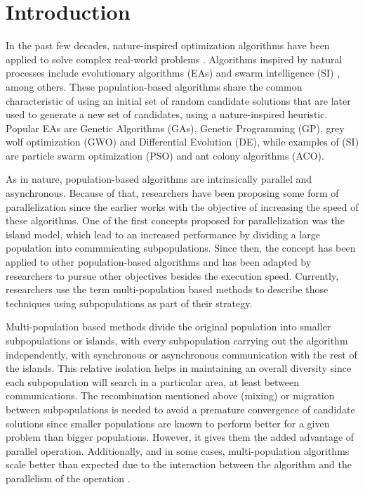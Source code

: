 \documentclass[runningheads]{llncs}
\begin{document}
\section{Introduction}

In the past few decades, nature-inspired optimization algorithms have been
applied to solve complex real-world problems \cite{yang2014nature}. Algorithms
inspired by natural processes include evolutionary algorithms (EAs)
\cite{back1996evolutionary} and swarm intelligence (SI) \cite{kennedy2006swarm},
among others. These population-based algorithms share the common characteristic
of using an initial set of random candidate solutions that are later used to
generate a new set of candidates, using a nature-inspired heuristic. Popular EAs
are Genetic Algorithms (GAs), Genetic Programming (GP), grey wolf optimization
(GWO) and Differential Evolution (DE), while examples of (SI) are particle swarm
optimization (PSO) and ant colony algorithms (ACO).


As in nature, population-based algorithms
are intrinsically parallel and asynchronous. Because of that, researchers have
been proposing some form of parallelization since the earlier works
\cite{muhlenbein1988evolution} with the objective of increasing the speed of
these algorithms. 
One of the first concepts proposed for parallelization was the island model,
which lead to an increased performance \cite{gorges1990explicit,grosso1985computer} 
by dividing a large population into communicating subpopulations.
Since then, the concept has been applied to other population-based algorithms
and has been adapted by researchers to pursue other objectives besides the
execution speed. Currently, researchers use the term multi-population based
methods to describe those techniques using subpopulations as part of their
strategy.

Multi-population based methods divide the original population into
smaller subpopulations or islands, with every subpopulation carrying out the
algorithm independently, with synchronous or asynchronous communication with the
rest of the islands. This relative isolation helps in maintaining an overall
diversity since each subpopulation will search in a particular area, at least
between communications. The recombination mentioned above (mixing) or migration
between subpopulations is needed to avoid a premature convergence of candidate
solutions since smaller populations are known to perform better for a given
problem than bigger populations. However, it gives them the added advantage of
parallel operation. Additionally, and in some cases, multi-population algorithms
scale better than expected due to the interaction between the algorithm and the
parallelism of the operation \cite{ALBA20027}.
\end{document}
